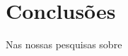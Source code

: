 \documentclass[a4paper,10pt]{article}
\begin{document}

%

 
\section{Conclusões}
Nas nossas pesquisas sobre 

\medskip
 
\printbibliography
\end{document}
